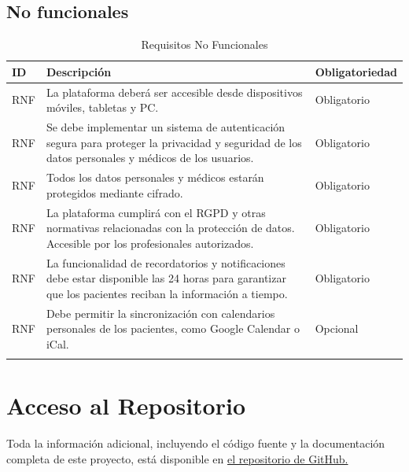 \documentclass{article}
\begin{document}
\subsection{No funcionales}

\begin{table}[H]
	\centering
	\caption{Requisitos No Funcionales}
	\begin{tabular}{@{} p{2.5cm} p{6.5cm} p{3cm} @{}}
		\toprule
		\textbf{ID} & \textbf{Descripción} & \textbf{Obligatoriedad} \\
		\midrule
		\addlinespace
		\stepcounter{requisitosNoFuncionales} RNF\therequisitosNoFuncionales & La plataforma deberá ser accesible desde dispositivos móviles, tabletas y PC. & Obligatorio \\
		\addlinespace
		\stepcounter{requisitosNoFuncionales} RNF\therequisitosNoFuncionales & Se debe implementar un sistema de autenticación segura para proteger la privacidad y seguridad de los datos personales y médicos de los usuarios. & Obligatorio\\
			\stepcounter{requisitosNoFuncionales} RNF\therequisitosNoFuncionales & Todos los datos personales y médicos estarán protegidos mediante cifrado. & Obligatorio \\
		\addlinespace
		\stepcounter{requisitosNoFuncionales} RNF\therequisitosNoFuncionales &La plataforma cumplirá con el RGPD y otras normativas relacionadas con la protección de datos. Accesible por los profesionales autorizados. & Obligatorio \\
		\addlinespace
		\stepcounter{requisitosNoFuncionales}
		RNF\therequisitosNoFuncionales & La funcionalidad de recordatorios y notificaciones debe estar disponible las 24 horas para garantizar que los pacientes reciban la información a tiempo. & Obligatorio \\
		\addlinespace
		\stepcounter{requisitosNoFuncionales}
		RNF\therequisitosNoFuncionales &  Debe permitir la sincronización con calendarios personales de los pacientes, como Google Calendar o iCal. & Opcional \\
		\addlinespace
		\bottomrule
	\end{tabular}
\end{table}
	
	\section{Acceso al Repositorio}
	
	Toda la información adicional, incluyendo el código fuente y la documentación completa de este proyecto, está disponible en  \href{https://github.com/Organizacion-basada-en-componentes/ingenieria_web}{el repositorio de GitHub.} 
	
	
\end{document}
